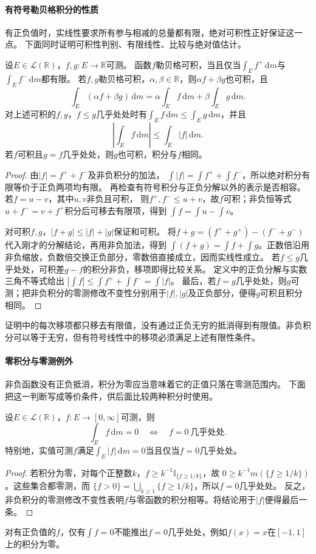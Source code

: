 \paragraph{有符号勒贝格积分的性质}
有正负值时，实线性要求所有参与相减的总量都有限，绝对可积性正好保证这一点。
下面同时证明可积性判别、有限线性、比较与绝对值估计。
\begin{theorem}[有符号勒贝格积分的基本性质]
\label{thm:analysis-signed-integral-properties}
设$E\in\mathcal L(\mathbb R)$，$f,g:E\to\mathbb R$可测。
函数$f$勒贝格可积，当且仅当$\int_E f^+\,\mathrm dm$与$\int_E f^-\,\mathrm dm$都有限。
若$f,g$勒贝格可积，$\alpha,\beta\in\mathbb R$，则$\alpha f+\beta g$也可积，且
\[
 \int_E(\alpha f+\beta g)\,\mathrm dm
 =\alpha\int_Ef\,\mathrm dm+\beta\int_Eg\,\mathrm dm.
\]
对上述可积的$f,g$，$f\leq g$几乎处处时有$\int_E f\,\mathrm dm\leq\int_E g\,\mathrm dm$，并且
\[
 \left|\int_Ef\,\mathrm dm\right|\leq\int_E|f|\,\mathrm dm.
\]
若$f$可积且$g=f$几乎处处，则$g$也可积，积分与$f$相同。
\end{theorem}
\begin{proof}
由$|f|=f^++f^-$及非负积分的加法，
$\int|f|=\int f^++\int f^-$，所以绝对积分有限等价于正负两项均有限。
再检查有符号积分与正负分解以外的表示是否相容。若$f=u-v$，其中$u,v$非负且可积，
则$f^+,f^-\leq u+v$，故$f$可积；非负恒等式$u+f^-=v+f^+$积分后可移去有限项，得到
$\int f=\int u-\int v$。

对可积$f,g$，$|f+g|\leq|f|+|g|$保证和可积。
将$f+g=(f^++g^+)-(f^-+g^-)$代入刚才的分解结论，再用非负加法，得到
$\int(f+g)=\int f+\int g$。正数倍沿用非负缩放，负数倍交换正负部分，零数倍直接成立，因而实线性成立。
若$f\leq g$几乎处处，可积差$g-f$的积分非负，移项即得比较关系。
定义中的正负分解与实数三角不等式给出
$|\int f|\leq\int f^++\int f^-=\int|f|$。
最后，若$f=g$几乎处处，则$g$可测；把非负积分的零测修改不变性分别用于$|f|,|g|$及正负部分，便得$g$可积且积分相同。
\end{proof}

证明中的每次移项都只移去有限值，没有通过正负无穷的抵消得到有限值。非负积分可以等于无穷，但有符号线性中的移项必须满足上述有限性条件。

\paragraph{零积分与零测例外}
非负函数没有正负抵消，积分为零应当意味着它的正值只落在零测范围内。
下面把这一判断写成等价条件，供后面比较两种积分时使用。
\begin{theorem}[非负函数的零积分判别]
\label{thm:analysis-zero-integral}
设$E\in\mathcal L(\mathbb R)$，$f:E\to[0,\infty]$可测，则
\[
 \int_Ef\,\mathrm dm=0\quad\Longleftrightarrow\quad f=0\ \text{几乎处处}.
\]
特别地，实值可测$f$满足$\int_E|f|\,\mathrm dm=0$当且仅当$f=0$几乎处处。
\end{theorem}
\begin{proof}
若积分为零，对每个正整数$k$，$f\geq k^{-1}\mathbb I_{\{f\geq1/k\}}$，故
$0\geq k^{-1}m(\{f\geq1/k\})$。这些集合都零测，而
$\{f>0\}=\bigcup_{k\geq1}\{f\geq1/k\}$，所以$f=0$几乎处处。
反之，非负积分的零测修改不变性表明$f$与零函数的积分相等。将结论用于$|f|$便得最后一条。
\end{proof}
对有正负值的$f$，仅有$\int f=0$不能推出$f=0$几乎处处，例如$f(x)=x$在$[-1,1]$上的积分为零。

